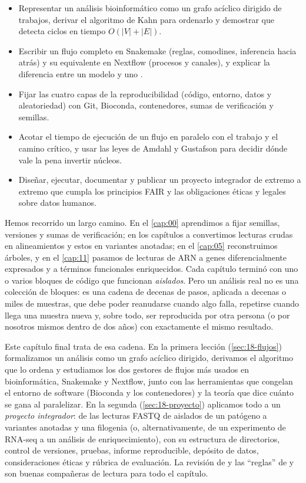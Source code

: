 \begin{objetivos}
\begin{itemize}
  \item Representar un análisis bioinformático como un grafo acíclico dirigido de trabajos, derivar el algoritmo de Kahn para ordenarlo y demostrar que detecta ciclos en tiempo $O(|V|+|E|)$.
  \item Escribir un flujo completo en Snakemake (reglas, comodines, inferencia hacia atrás) y su equivalente en Nextflow (procesos y canales), y explicar la diferencia entre un modelo  y uno .
  \item Fijar las cuatro capas de la reproducibilidad (código, entorno, datos y aleatoriedad) con Git, Bioconda, contenedores, sumas de verificación y semillas.
  \item Acotar el tiempo de ejecución de un flujo en paralelo con el trabajo y el camino crítico, y usar las leyes de Amdahl y Gustafson para decidir dónde vale la pena invertir núcleos.
  \item Diseñar, ejecutar, documentar y publicar un proyecto integrador de extremo a extremo que cumpla los principios FAIR y las obligaciones éticas y legales sobre datos humanos.
\end{itemize}
\end{objetivos}

Hemos recorrido un largo camino. En el \cref{cap:00} aprendimos a fijar semillas, versiones y sumas de verificación; en los capítulos  a  convertimos lecturas crudas en alineamientos y estos en variantes anotadas; en el \cref{cap:05} reconstruimos árboles, y en el \cref{cap:11} pasamos de lecturas de ARN a genes diferencialmente expresados y a términos funcionales enriquecidos. Cada capítulo terminó con uno o varios bloques de código que funcionan \emph{aislados}. Pero un análisis real no es una colección de bloques: es una cadena de decenas de pasos, aplicada a decenas o miles de muestras, que debe poder reanudarse cuando algo falla, repetirse cuando llega una muestra nueva y, sobre todo, ser reproducida por otra persona (o por nosotros mismos dentro de dos años) con exactamente el mismo resultado.

Este capítulo final trata de esa cadena. En la primera lección (\cref{sec:18-flujos}) formalizamos un análisis como un grafo acíclico dirigido, derivamos el algoritmo que lo ordena y estudiamos los dos gestores de flujos más usados en bioinformática, Snakemake y Nextflow, junto con las herramientas que congelan el entorno de software (Bioconda y los contenedores) y la teoría que dice cuánto se gana al paralelizar. En la segunda (\cref{sec:18-proyecto}) aplicamos todo a un \emph{proyecto integrador}: de las lecturas FASTQ de aislados de un patógeno a variantes anotadas y una filogenia (o, alternativamente, de un experimento de RNA-seq a un análisis de enriquecimiento), con su estructura de directorios, control de versiones, pruebas, informe reproducible, depósito de datos, consideraciones éticas y rúbrica de evaluación. La revisión de \textcite{c18-wratten2021} y las ``reglas'' de \textcite{c18-sandve2013} y \textcite{c18-wilson2017} son buenas compañeras de lectura para todo el capítulo.

